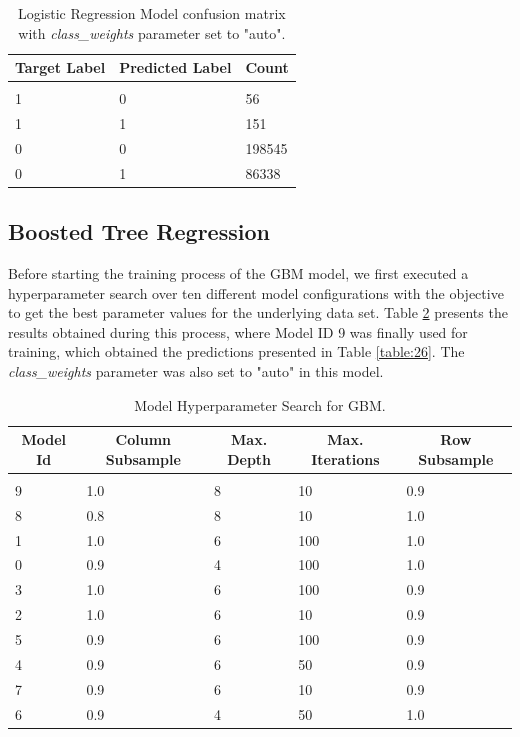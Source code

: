 \documentclass{article} %
\begin{document}
\begin{table}[!htbp]
\caption{Logistic Regression Model confusion matrix with \textit{class\_weights} parameter set to "auto".}
\label{table:24}
\begin{center}
\begin{tabular}{l l l}
\multicolumn{1}{c}{\bf Target Label} & \multicolumn{1}{c}{\bf Predicted Label} & \multicolumn{1}{c}{\bf Count}
\\ \hline \\
1 & 0 & 56\\
1 & 1 & 151\\
0 & 0 & 198545\\
0 & 1 & 86338\\
\end{tabular}
\end{center}
\end{table}

\subsection{Boosted Tree Regression}

Before starting the training process of the GBM model, we first executed a hyperparameter search over ten different model configurations with the objective to get the best parameter values for the underlying data set. Table \ref{table:25} presents the results obtained during this process, where Model ID 9 was finally used for training, which obtained the predictions presented in Table \ref{table:26}. The \textit{class\_weights} parameter was also set to "auto" in this model.

\begin{table}[!htbp]
\caption{Model Hyperparameter Search for GBM.}
\label{table:25}
\begin{center}
\begin{tabular}{l l l l l}
\multicolumn{1}{c}{\bf Model Id} & \multicolumn{1}{c}{\bf Column Subsample} &
\multicolumn{1}{c}{\bf Max. Depth} & \multicolumn{1}{c}{\bf Max. Iterations} &
\multicolumn{1}{c}{\bf Row Subsample}
\\ \hline \\
9 & 1.0 & 8 & 10 & 0.9\\
8 & 0.8 & 8 & 10 & 1.0\\
1 & 1.0 & 6 & 100 & 1.0\\
0 & 0.9 & 4 & 100 & 1.0\\
3 & 1.0 & 6 & 100 & 0.9\\
2 & 1.0 & 6 & 10 & 0.9\\
5 & 0.9 & 6 & 100 & 0.9\\
4 & 0.9 & 6 & 50 & 0.9\\
7 & 0.9 & 6 & 10 & 0.9\\
6 & 0.9 & 4 & 50 & 1.0\\
\end{tabular}
\end{center}
\end{table}
\end{document}
